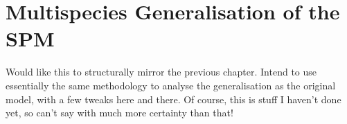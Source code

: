 \chapter{Multispecies Generalisation of the SPM}
Would like this to structurally mirror the previous chapter. Intend to use essentially the same methodology to analyse the generalisation as the original model, with a few tweaks here and there.
Of course, this is stuff I haven't done yet, so can't say with much more certainty than that!